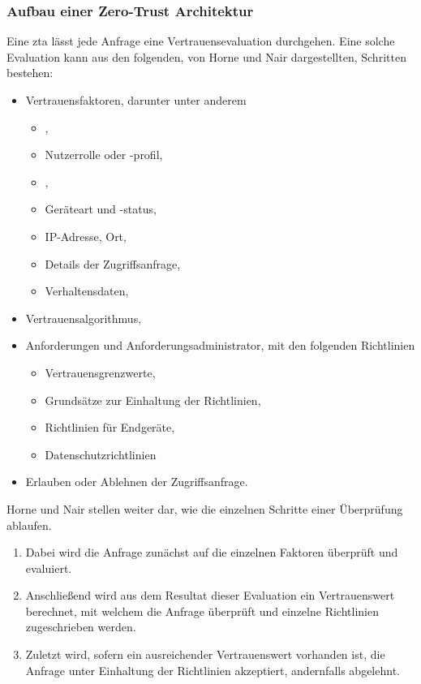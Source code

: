 \subsubsection{Aufbau einer Zero-Trust Architektur}

Eine \ac{zta} lässt jede Anfrage eine Vertrauensevaluation durchgehen.
Eine solche Evaluation kann aus den folgenden, von Horne und Nair\autocite[\vglf][]{horne-2021} dargestellten, Schritten bestehen:
\begin{itemize}
    \item Vertrauensfaktoren, darunter unter anderem
    \begin{itemize}
        \item {},
        \item Nutzerrolle oder -profil,
        \item {},
        \item Geräteart und -status,
        \item IP-Adresse, \bzw Ort,
        \item Details der Zugriffsanfrage,
        \item Verhaltensdaten,
    \end{itemize}
    \item Vertrauensalgorithmus,
    \item Anforderungen und Anforderungsadministrator, mit den folgenden Richtlinien
    \begin{itemize}
        \item Vertrauensgrenzwerte,
        \item Grundsätze zur Einhaltung der Richtlinien,
        \item Richtlinien für Endgeräte,
        \item Datenschutzrichtlinien
    \end{itemize}
    \item Erlauben oder Ablehnen der Zugriffsanfrage.
\end{itemize}
Horne und Nair stellen weiter dar, wie die einzelnen Schritte einer Überprüfung ablaufen.\autocite[\vglf][]{horne-2021}
\begin{enumerate}
    \item Dabei wird die Anfrage zunächst auf die einzelnen Faktoren überprüft und evaluiert.
    \item Anschließend wird aus dem Resultat dieser Evaluation ein Vertrauenswert berechnet, mit welchem die Anfrage überprüft und einzelne Richtlinien zugeschrieben werden.
    \item Zuletzt wird, sofern ein ausreichender Vertrauenswert vorhanden ist, die Anfrage unter Einhaltung der Richtlinien akzeptiert, andernfalls abgelehnt.
\end{enumerate}

